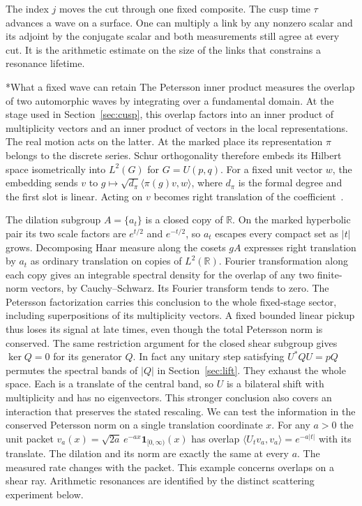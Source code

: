 \documentclass[11pt,letterpaper]{article}
\makeatletter
\renewcommand\subsection{\@startsection{subsection}{2}{\z@}{-2.0ex plus -.3ex}{.75ex}{\normalfont\normalsize\itshape}}
\numberwithin{equation}{section}
\makeatother
\begin{document}
The index $j$ moves the cut through one fixed composite. The cusp time $\tau$ advances a wave on a surface. One can multiply a link by any nonzero scalar and its adjoint by the conjugate scalar and both measurements still agree at every cut. It is the arithmetic estimate on the size of the links that constrains a resonance lifetime.

\subsection*{What a fixed wave can retain}
The Petersson inner product measures the overlap of two automorphic waves by integrating over a fundamental domain. At the stage used in Section~\ref{sec:cusp}, this overlap factors into an inner product of multiplicity vectors and an inner product of vectors in the local representations. The real motion acts on the latter. At the marked place its representation $\pi$ belongs to the discrete series. Schur orthogonality therefore embeds its Hilbert space isometrically into $L^2(G)$ for $G=U(p,q)$. For a fixed unit vector $w$, the embedding sends $v$ to $g\mapsto\sqrt{d_\pi}\langle \pi(g)v,w\rangle$, where $d_\pi$ is the formal degree and the first slot is linear. Acting on $v$ becomes right translation of the coefficient~\cite{thetaoriginal,shearmetric}.

The dilation subgroup $A=\{a_t\}$ is a closed copy of $\mathbb R$. On the marked hyperbolic pair its two scale factors are $e^{t/2}$ and $e^{-t/2}$, so $a_t$ escapes every compact set as $|t|$ grows. Decomposing Haar measure along the cosets $gA$ expresses right translation by $a_t$ as ordinary translation on copies of $L^2(\mathbb R)$. Fourier transformation along each copy gives an integrable spectral density for the overlap of any two finite-norm vectors, by Cauchy--Schwarz. Its Fourier transform tends to zero. The Petersson factorization carries this conclusion to the whole fixed-stage sector, including superpositions of its multiplicity vectors. A fixed bounded linear pickup thus loses its signal at late times, even though the total Petersson norm is conserved. The same restriction argument for the closed shear subgroup gives $\ker Q=0$ for its generator $Q$. In fact any unitary step satisfying $U^*QU=pQ$ permutes the spectral bands of $|Q|$ in Section~\ref{sec:lift}. They exhaust the whole space. Each is a translate of the central band, so $U$ is a bilateral shift with multiplicity and has no eigenvectors. This stronger conclusion also covers an interaction that preserves the stated rescaling. We can test the information in the conserved Petersson norm on a single translation coordinate $x$. For any $a>0$ the unit packet $v_a(x)=\sqrt{2a}\,e^{-a x}\mathbf1_{[0,\infty)}(x)$ has overlap $\langle U_t v_a,v_a\rangle=e^{-a|t|}$ with its translate. The dilation and its norm are exactly the same at every $a$. The measured rate changes with the packet. This example concerns overlaps on a shear ray. Arithmetic resonances are identified by the distinct scattering experiment below.
\end{document}
